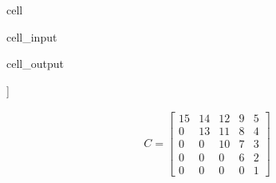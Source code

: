 \documentclass[letterpaper,10pt,english]{jupyterBook}
\begin{document}
\begin{sphinxuseclass}{cell}\begin{sphinxVerbatimInput}

\begin{sphinxuseclass}{cell_input}
\begin{sphinxVerbatim}[commandchars=\\\{\}]
   
\end{sphinxVerbatim}

\end{sphinxuseclass}\end{sphinxVerbatimInput}
\begin{sphinxVerbatimOutput}

\begin{sphinxuseclass}{cell_output}
\begin{sphinxVerbatim}[commandchars=\\\{\}]
[[0 0 0 0 0]
 [0 0 0 0 0]
 [0 0 0 0 0]
 [0 0 0 0 0]
 [0 0 0 0 0]]
\end{sphinxVerbatim}

\end{sphinxuseclass}\end{sphinxVerbatimOutput}

\end{sphinxuseclass}\begin{equation*}
\begin{split}
C = \begin{bmatrix}
  15 &  14 &  12 &  9 &  5\\
  0 &  13 &  11 &  8 &  4\\
  0 &  0 &  10 &  7 &  3\\
  0 &  0 &  0 &  6 &  2\\
  0 &  0 &  0 &  0 &  1
\end{bmatrix}
\end{split}
\end{equation*}
\end{document}
